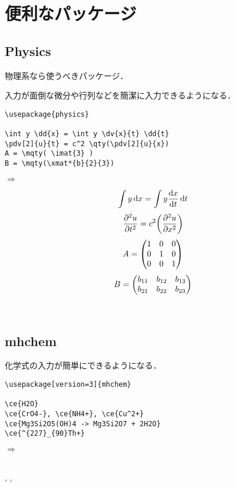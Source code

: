 \documentclass{jsarticle}
\begin{document}
\section{便利なパッケージ}
\subsection{Physics}
物理系なら使うべきパッケージ．

入力が面倒な微分や行列などを簡潔に入力できるようになる．

\begin{minipage}[c]{.50\textwidth}
\begin{screen}
\small
\begin{verbatim}
\usepackage{physics}

\int y \dd{x} = \int y \dv{x}{t} \dd{t}
\pdv[2]{u}{t} = c^2 \qty(\pdv[2]{u}{x})
A = \mqty( \imat{3} )
B = \mqty(\xmat*{b}{2}{3}) 
\end{verbatim}
\end{screen}
\end{minipage}%
$\Rightarrow$
\begin{minipage}{.45\textwidth}
\begin{shadebox}
\[\int y \dd{x} = \int y \dv{x}{t} \dd{t} \]
\[\pdv[2]{u}{t} = c^2 \qty(\pdv[2]{u}{x}) \]
\[A = \mqty( \imat{3} ) \]
\[B = \mqty(\xmat*{b}{2}{3})\]
\end{shadebox}
\end{minipage}
\vspace*{1mm}\\

\subsection{mhchem}
化学式の入力が簡単にできるようになる．

\begin{minipage}[c]{.50\textwidth}
\begin{screen}
\small
\begin{verbatim}
\usepackage[version=3]{mhchem}

\ce{H2O}
\ce{CrO4-}, \ce{NH4+}, \ce{Cu^2+}
\ce{Mg3Si2O5(OH)4 -> Mg3Si2O7 + 2H2O}
\ce{^{227}_{90}Th+}
\end{verbatim}
\end{screen}
\end{minipage}%
$\Rightarrow$
\begin{minipage}{.45\textwidth}
\begin{shadebox}
 \\
, , \\
\end{shadebox}
\end{minipage}
\vspace*{1mm}\\
\end{document}
